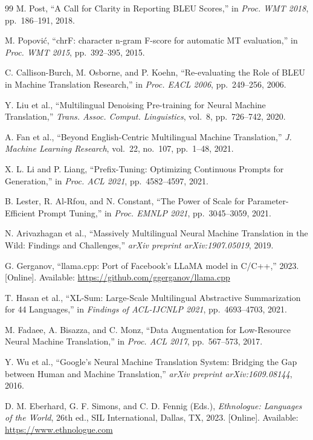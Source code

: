 \documentclass[journal]{IEEEtran}
\begin{document}
\begin{thebibliography}{99}
M. Post, ``A Call for Clarity in Reporting BLEU Scores,''
in \textit{Proc. WMT 2018}, pp.~186--191, 2018.

M. Popovi\'{c}, ``chrF: character n-gram F-score for automatic MT evaluation,''
in \textit{Proc. WMT 2015}, pp.~392--395, 2015.

C. Callison-Burch, M. Osborne, and P. Koehn,
``Re-evaluating the Role of BLEU in Machine Translation Research,''
in \textit{Proc. EACL 2006}, pp.~249--256, 2006.

Y. Liu et al., ``Multilingual Denoising Pre-training for Neural Machine Translation,''
\textit{Trans. Assoc. Comput. Linguistics}, vol.~8, pp.~726--742, 2020.

A. Fan et al., ``Beyond English-Centric Multilingual Machine Translation,''
\textit{J. Machine Learning Research}, vol.~22, no.~107, pp.~1--48, 2021.

X. L. Li and P. Liang, ``Prefix-Tuning: Optimizing Continuous Prompts for Generation,''
in \textit{Proc. ACL 2021}, pp.~4582--4597, 2021.

B. Lester, R. Al-Rfou, and N. Constant,
``The Power of Scale for Parameter-Efficient Prompt Tuning,''
in \textit{Proc. EMNLP 2021}, pp.~3045--3059, 2021.

N. Arivazhagan et al., ``Massively Multilingual Neural Machine Translation in the Wild:
Findings and Challenges,''
\textit{arXiv preprint arXiv:1907.05019}, 2019.

G. Gerganov, ``llama.cpp: Port of Facebook's LLaMA model in C/C++,'' 2023.
[Online]. Available: \url{https://github.com/ggerganov/llama.cpp}

T. Hasan et al., ``XL-Sum: Large-Scale Multilingual Abstractive Summarization
for 44 Languages,''
in \textit{Findings of ACL-IJCNLP 2021}, pp.~4693--4703, 2021.

M. Fadaee, A. Bisazza, and C. Monz,
``Data Augmentation for Low-Resource Neural Machine Translation,''
in \textit{Proc. ACL 2017}, pp.~567--573, 2017.

Y. Wu et al., ``Google's Neural Machine Translation System: Bridging the Gap between
Human and Machine Translation,''
\textit{arXiv preprint arXiv:1609.08144}, 2016.

D. M. Eberhard, G. F. Simons, and C. D. Fennig (Eds.),
\textit{Ethnologue: Languages of the World}, 26th ed.,
SIL International, Dallas, TX, 2023.
[Online]. Available: \url{https://www.ethnologue.com}


\end{thebibliography}
\end{document}
